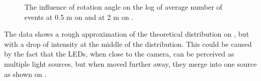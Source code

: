 \begin{figure}[htbp]
	\centering
	\caption{
  The influence of rotation angle on the log of average number of events at 0.5 m on  and at 2 m on .
  }
	\label{fig:angles}
\end{figure}
The data shows a rough approximation of the theoretical distribution on ,
but with a drop of intensity at the middle of the distribution. This could be caused
by the fact that the LEDs, when close to the camera, can be perceived as multiple light sources,
but when moved further away, they merge into one source as shown on .

